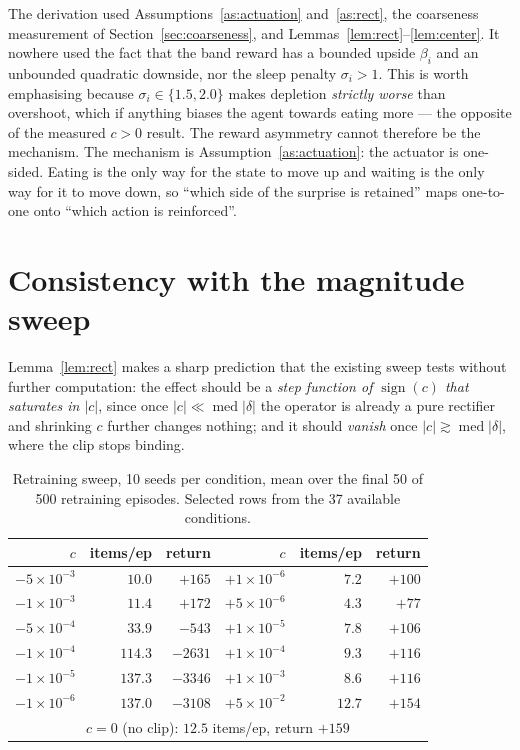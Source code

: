 \documentclass[11pt]{article}
\theoremstyle{definition}
\begin{document}
The derivation used Assumptions~\ref{as:actuation} and~\ref{as:rect}, the
coarseness measurement of Section~\ref{sec:coarseness}, and
Lemmas~\ref{lem:rect}--\ref{lem:center}. It nowhere used the fact that the
band reward has a bounded upside $\beta_i$ and an unbounded quadratic
downside, nor the sleep penalty $\sigma_i>1$. This is worth emphasising
because $\sigma_i\in\{1.5,2.0\}$ makes depletion \emph{strictly worse} than
overshoot, which if anything biases the agent towards eating more --- the
opposite of the measured $c>0$ result. The reward asymmetry cannot therefore
be the mechanism. The mechanism is Assumption~\ref{as:actuation}: the actuator
is one-sided. Eating is the only way for the state to move up and waiting is
the only way for it to move down, so ``which side of the surprise is retained''
maps one-to-one onto ``which action is reinforced''.

\section{Consistency with the magnitude sweep}
\label{sec:sweep}

Lemma~\ref{lem:rect} makes a sharp prediction that the existing sweep tests
without further computation: the effect should be a \emph{step function of
$\operatorname{sign}(c)$ that saturates in $|c|$}, since once
$|c|\ll\operatorname{med}|\delta|$ the operator is already a pure rectifier and
shrinking $c$ further changes nothing; and it should \emph{vanish} once
$|c|\gtrsim\operatorname{med}|\delta|$, where the clip stops binding.

\begin{table}[t]
\centering
\caption{Retraining sweep, 10 seeds per condition, mean over the final 50 of
500 retraining episodes. Selected rows from the 37 available conditions.}
\label{tab:sweep}
\begin{tabular}{rrr@{\hskip 2.2em}rrr}
\toprule
$c$ & items/ep & return & $c$ & items/ep & return\\
\midrule
$-5\times10^{-3}$ & $10.0$  & $+165$  & $+1\times10^{-6}$ & $7.2$  & $+100$\\
$-1\times10^{-3}$ & $11.4$  & $+172$  & $+5\times10^{-6}$ & $4.3$  & $+77$ \\
$-5\times10^{-4}$ & $33.9$  & $-543$  & $+1\times10^{-5}$ & $7.8$  & $+106$\\
$-1\times10^{-4}$ & $114.3$ & $-2631$ & $+1\times10^{-4}$ & $9.3$  & $+116$\\
$-1\times10^{-5}$ & $137.3$ & $-3346$ & $+1\times10^{-3}$ & $8.6$  & $+116$\\
$-1\times10^{-6}$ & $137.0$ & $-3108$ & $+5\times10^{-2}$ & $12.7$ & $+154$\\
\midrule
\multicolumn{6}{c}{$c=0$ (no clip): $12.5$ items/ep, return $+159$}\\
\bottomrule
\end{tabular}
\end{table}
\end{document}
